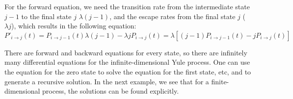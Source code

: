 \documentclass[11pt]{book}
\begin{document}
For the forward equation, we need the transition rate from the intermediate state $j-1$ to the final state $j$ $\lambda (j-1) $, and the escape rates from the final state $j$ ($\lambda j $), which results in the following equation:
$$ P'_{i \rightarrow j} (t) = P_{i \rightarrow j-1}(t)  \lambda (j-1)  -  \lambda j  P_{i  \rightarrow j}(t) = \lambda[(j-1)P_{i \rightarrow j-1}(t) -  j  P_{i  \rightarrow j}(t) ]$$

There are forward and backward equations for every state, so there are infinitely many differential equations for the infinite-dimensional Yule process. One can use the equation for the zero state to solve the equation for the first state, etc, and to generate a recursive solution. In the next example, we see that for a finite-dimensional process, the solutions can be found explicitly.
\end{document}
